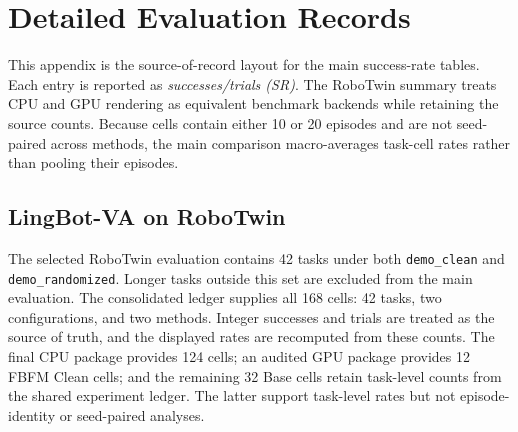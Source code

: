 
\section{Detailed Evaluation Records}
\label{app:detailed-results}

This appendix is the source-of-record layout for the main success-rate tables.
Each entry is reported as \emph{successes/trials (SR)}. The RoboTwin summary
treats CPU and GPU rendering as equivalent benchmark backends while retaining
the source counts. Because cells contain either 10 or 20 episodes and are not
seed-paired across methods, the main comparison macro-averages task-cell rates
rather than pooling their episodes.

\subsection{LingBot-VA on RoboTwin}

The selected RoboTwin evaluation contains 42 tasks under both
\texttt{demo\_clean} and \texttt{demo\_randomized}. Longer tasks outside this
set are excluded from the main evaluation. The consolidated ledger supplies
all 168 cells: 42 tasks, two configurations, and two methods. Integer successes
and trials are treated as the source of truth, and the displayed rates are
recomputed from these counts. The final CPU package provides 124 cells; an
audited GPU package provides 12 FBFM Clean cells; and the remaining 32 Base
cells retain task-level counts from the shared experiment ledger. The latter
support task-level rates but not episode-identity or seed-paired analyses.


